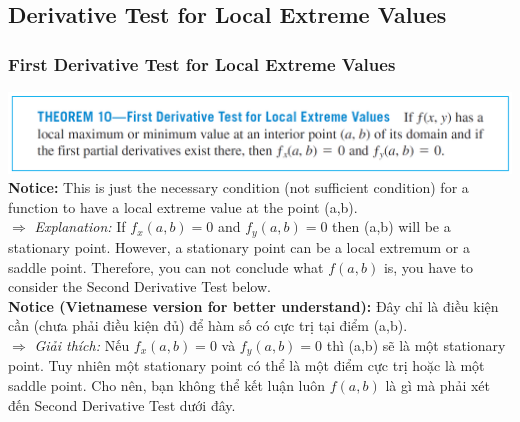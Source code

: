 \documentclass{article}
\begin{document}
\subsection{Derivative Test for Local Extreme Values}
\subsubsection{First Derivative Test for Local Extreme Values}
\includegraphics[width=1\linewidth]{3.3.png}\\
\textbf{Notice: } This is just the necessary condition (not sufficient condition) for a function to have a local extreme value at the point (a,b). \\
$\Rightarrow$\textit{ Explanation:} If $f_x(a,b)=0$ and $f_y(a,b)=0$ then (a,b) will be a stationary point. However, a stationary point can be a local extremum or a saddle point. Therefore, you can not conclude what $f(a,b)$ is, you have to consider the Second Derivative Test below.\\
\textbf{Notice (Vietnamese version for better understand):} Đây chỉ là điều kiện cần (chưa phải điều kiện đủ) để hàm số có cực trị tại điểm (a,b).\\
$\Rightarrow$ \textit{Giải thích:} Nếu $f_x(a,b)=0$ và $f_y(a,b)=0$ thì (a,b) sẽ là một stationary point. Tuy nhiên một stationary point có thể là một điểm cực trị hoặc là một saddle point. Cho nên, bạn không thể kết luận luôn $f(a,b)$ là gì mà phải xét đến Second Derivative Test dưới đây.
\end{document}
